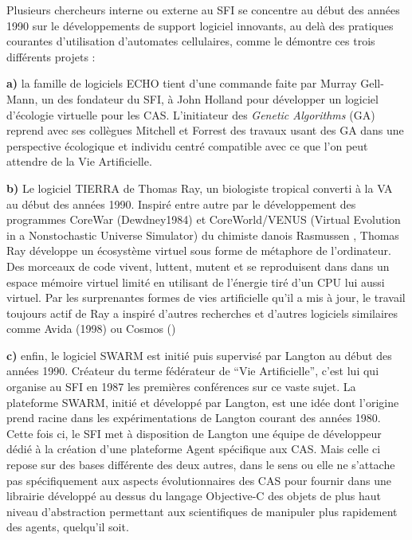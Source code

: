 Plusieurs chercheurs interne ou externe au SFI se concentre au début des années 1990 sur le développements de support logiciel innovants, au delà des pratiques courantes d'utilisation d'automates cellulaires, comme le démontre ces trois différents projets : 

\textbf{a)} la famille de logiciels ECHO tient d'une commande faite par Murray Gell-Mann, un des fondateur du SFI, à John Holland pour développer un logiciel d'écologie virtuelle pour les CAS. L'initiateur des \textit{Genetic Algorithms} (GA) reprend avec ses collègues Mitchell et Forrest des travaux usant des GA dans une perspective écologique et individu centré compatible avec ce que l'on peut attendre de la Vie Artificielle. \autocites{Holland1993, Mitchell1993, Smith2000}

\textbf{b)} Le logiciel TIERRA de Thomas Ray, un biologiste tropical converti à la VA au début des années 1990. Inspiré entre autre par le développement des programmes CoreWar (Dewdney1984) et CoreWorld/VENUS (Virtual Evolution in a Nonstochastic Universe Simulator) du chimiste danois Rasmussen \autocite{Rasmussen1990}, Thomas Ray développe un écosystème virtuel sous forme de métaphore de l'ordinateur. Des morceaux de code vivent, luttent, mutent et se reproduisent dans dans un espace mémoire virtuel limité en utilisant de l'énergie tiré d'un CPU lui aussi virtuel. Par les surprenantes formes de vies artificielle qu'il a mis à jour, le travail toujours actif de Ray a inspiré d'autres recherches et d'autres logiciels similaires comme Avida (1998) ou Cosmos (\autocite{Taylor1999})

\textbf{c)} enfin, le logiciel SWARM \autocite{Minar1996} est initié puis supervisé par Langton au début des années 1990. Créateur du terme fédérateur de \enquote{Vie Artificielle}, c'est lui qui organise au SFI en 1987 les premières conférences sur ce vaste sujet. La plateforme SWARM, initié et développé par Langton, est une idée dont l'origine prend racine dans les expérimentations de Langton courant des années 1980. Cette fois ci, le SFI met à disposition de Langton une équipe de développeur dédié à la création d'une plateforme Agent spécifique aux CAS. Mais celle ci repose sur des bases différente des deux autres, dans le sens ou elle ne s'attache pas spécifiquement aux aspects évolutionnaires des CAS pour fournir dans une librairie développé au dessus du langage Objective-C des objets de plus haut niveau d'abstraction permettant aux scientifiques de manipuler plus rapidement des agents, quelqu'il soit.

